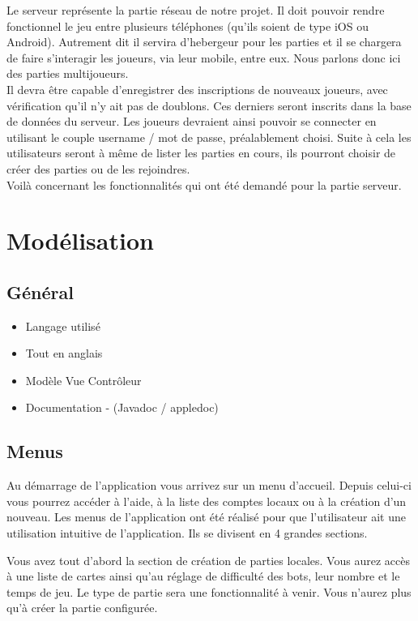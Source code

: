 \documentclass[a4paper,11pt]{report}
\begin{document}
		Le serveur représente la partie réseau de notre projet. Il doit pouvoir
		rendre fonctionnel le jeu entre plusieurs téléphones (qu'ils soient de type
		iOS ou Android). Autrement dit il servira d'hebergeur pour les parties et
		il se chargera de faire s'interagir les joueurs, via leur mobile, entre eux.
		Nous parlons donc ici des parties multijoueurs.\\ 
		Il devra être capable d'enregistrer des inscriptions de nouveaux joueurs, avec
		vérification qu'il n'y ait pas de doublons. Ces derniers seront inscrits dans 
		la base de données du serveur. Les joueurs devraient ainsi
		pouvoir se connecter en utilisant le couple username / mot de passe,
		préalablement choisi. Suite à cela les utilisateurs seront à même de lister
		les parties en cours, ils pourront choisir de créer des parties ou de les rejoindres.\\
		Voilà concernant les fonctionnalités qui ont été demandé pour la partie
		serveur.
	
	\section{Modélisation}
		\subsection{Général}
			\begin{itemize}
				\item{Langage utilisé}
				\item{Tout en anglais}
				\item{Modèle Vue Contrôleur}
				\item{Documentation - (Javadoc / appledoc)}
			\end{itemize}
			
		\subsection{Menus}
		Au démarrage de l'application vous arrivez sur un menu d'accueil. Depuis
		celui-ci vous pourrez accéder à l'aide, à la liste des comptes locaux ou à la
		création d'un nouveau.
		Les menus de l'application ont été réalisé pour que l'utilisateur ait
		une utilisation intuitive de l'application. Ils se divisent en 4 grandes sections.
		
		Vous avez tout d'abord la section de création de parties locales. Vous aurez
		accès à une liste de cartes ainsi qu'au réglage de difficulté des bots, leur
		nombre et le temps de jeu. Le type de partie sera une fonctionnalité à venir.
		Vous n'aurez plus qu'à créer la partie configurée.
		
\end{document}
